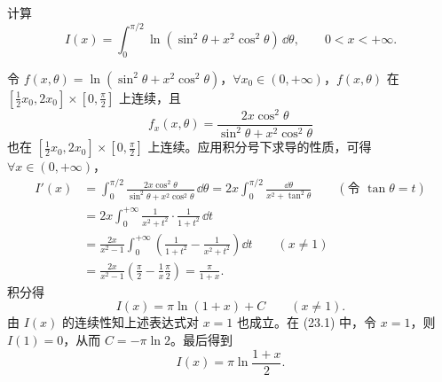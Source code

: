 \begin{xexample}[23.1.3]
计算
\begin{equation}
  I(x)=\int_0^{\pi/2}\ln(\sin^2\theta+x^2\cos^2\theta)\,\dd\theta,
  \qquad 0<x<+\infty.
  \tag{23.1}
  \label{eq:23.1}
\end{equation}
\end{xexample}
\begin{xsolution}
令 $f(x,\theta)=\ln(\sin^2\theta+x^2\cos^2\theta)$，$\forall x_0\in(0,+\infty)$，$f(x,\theta)$ 在 $[\frac12x_0,2x_0]\times[0,\frac\pi2]$ 上连续，且
\[
  f_x(x,\theta)=\frac{2x\cos^2\theta}{\sin^2\theta+x^2\cos^2\theta}
\]
也在 $[\frac12x_0,2x_0]\times[0,\frac\pi2]$ 上连续。应用积分号下求导的性质，可得 $\forall x\in(0,+\infty)$，
\[
\begin{aligned}
  I'(x)
  &=\int_0^{\pi/2}\frac{2x\cos^2\theta}{\sin^2\theta+x^2\cos^2\theta}\,\dd\theta
   =2x\int_0^{\pi/2}\frac{\dd\theta}{x^2+\tan^2\theta}\qquad(\text{令 }\tan\theta=t)\\
  &=2x\int_0^{+\infty}\frac{1}{x^2+t^2}\cdot\frac{1}{1+t^2}\,\dd t\\
  &=\frac{2x}{x^2-1}\int_0^{+\infty}
  \left(\frac{1}{1+t^2}-\frac{1}{x^2+t^2}\right)\dd t\qquad(x\neq1)\\
  &=\frac{2x}{x^2-1}\left(\frac\pi2-\frac1x\frac\pi2\right)
  =\frac{\pi}{1+x}.
\end{aligned}
\]
积分得
\[
  I(x)=\pi\ln(1+x)+C\qquad(x\neq1).
\]
由 $I(x)$ 的连续性知上述表达式对 $x=1$ 也成立。在 (23.1) 中，令 $x=1$，则 $I(1)=0$，从而 $C=-\pi\ln2$。最后得到
\[
  I(x)=\pi\ln\frac{1+x}{2}.
\]
\end{xsolution}

